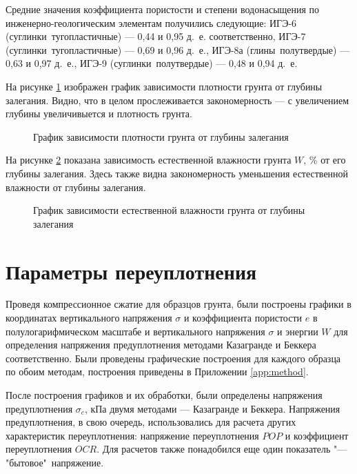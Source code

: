 Средние значения коэффициента пористости и 
степени водонасыщения по инженерно-геологическим 
элементам получились следующие:
ИГЭ-6 (суглинки тугопластичные) --- 0,44 и 0,95 д.~е. соответственно, 
ИГЭ-7 (суглинки тугопластичные) --- 0,69 и 0,96 д.~е., 
ИГЭ-8а (глины полутвердые) --- 0,63 и 0,97 д.~е., 
ИГЭ-9 (суглинки полутвердые) --- 0,48 и 0,94 д.~е.

На рисунке \ref{fig:plgl} изображен график зависимости плотности 
грунта от глубины залегания. Видно, что в целом прослеживается 
закономерность --- с увеличением глубины увеличивыется и 
плотность грунта.

\begin{figure}[ht]
  \caption{График зависимости плотности грунта от глубины залегания}\label{fig:plgl}
\end{figure}

На рисунке \ref{fig:vlgl} показана зависимость 
естественной влажности грунта $W$, \% от его глубины залегания.
Здесь также видна закономерность уменьшения естественной 
влажности от глубины залегания.

\begin{figure}[ht]
  \caption{График зависимости естественной влажности грунта от глубины залегания}\label{fig:vlgl}
\end{figure}

\section{Параметры переуплотнения}

Проведя компрессионное сжатие для образцов грунта, были построены 
графики в координатах вертикального напряжения $\sigma$ и коэффициента пористости $e$ 
в полулогарифмическом масштабе и вертикального напряжения $\sigma$ 
и энергии $W$ для определения напряжения предуплотнения 
методами Казагранде и Беккера соответственно. Были проведены 
графические построения для каждого образца по обоим 
методам, построения приведены в Приложении \ref{app:method}.

После построения графиков и их обработки, были определены 
напряжения предуплотнения $\sigma_c$, кПа двумя методами ---
Казагранде и Беккера. 
Напряжения предуплотнения, в свою очередь, использовались для расчета 
других характеристик переуплотнения: напряжение 
переуплотнения $POP$ и коэффициент переуплотнения $OCR$.
Для расчетов также понадобился еще один показатель "--- 
"бытовое"\ напряжение.

